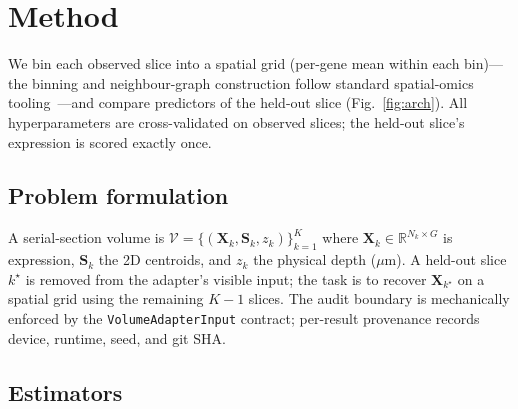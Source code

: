 \documentclass[10pt,letterpaper]{article}
\begin{document}
\section{Method}
\label{sec:method}

We bin each observed slice into a spatial grid (per-gene mean within each bin)---the binning
and neighbour-graph construction follow standard spatial-omics tooling~\cite{squidpy}---and
compare predictors of the held-out slice (Fig.~\ref{fig:arch}).
All hyperparameters are cross-validated on observed slices; the held-out slice's expression
is scored exactly once.

\subsection{Problem formulation}
\label{sec:problem}

A serial-section volume is $\mathcal{V} = \{(\mathbf{X}_k, \mathbf{S}_k, z_k)\}_{k=1}^K$
where $\mathbf{X}_k \in \mathbb{R}^{N_k \times G}$ is expression, $\mathbf{S}_k$ the 2D
centroids, and $z_k$ the physical depth ($\mu$m). A held-out slice $k^\star$ is removed from
the adapter's visible input; the task is to recover $\mathbf{X}_{k^\star}$ on a spatial grid
using the remaining $K-1$ slices. The audit boundary is mechanically enforced by the
\texttt{VolumeAdapterInput} contract; per-result provenance records device, runtime, seed,
and git SHA.

\subsection{Estimators}
\label{sec:estimators}
\end{document}
